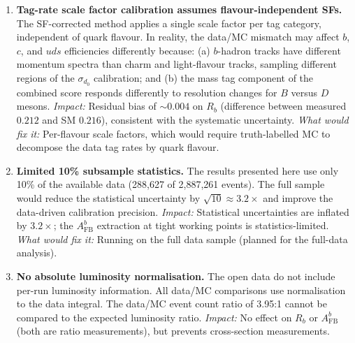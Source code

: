 \documentclass[11pt,a4paper]{article}
\begin{document}
\begin{enumerate}
\item \textbf{Tag-rate scale factor calibration assumes
  flavour-independent SFs.}
  The SF-corrected method applies a single scale factor per
  tag category, independent of quark flavour.
  In reality, the data/MC mismatch may affect $b$, $c$, and
  $uds$ efficiencies differently because:
  (a) $b$-hadron tracks have different momentum spectra than
  charm and light-flavour tracks, sampling different regions of
  the $\sigma_{d_0}$ calibration; and
  (b) the mass tag component of the combined score responds
  differently to resolution changes for $B$ versus $D$ mesons.
  \textit{Impact:} Residual bias of $\sim 0.004$ on $R_b$
  (difference between measured $0.212$ and SM $0.216$),
  consistent with the systematic uncertainty.
  \textit{What would fix it:} Per-flavour scale factors, which
  would require truth-labelled MC to decompose the data tag rates
  by quark flavour.

\item \textbf{Limited 10\% subsample statistics.}
  The results presented here use only 10\% of the available data
  (288,627 of 2,887,261 events).
  The full sample would reduce the statistical uncertainty by
  $\sqrt{10} \approx 3.2\times$ and improve the data-driven
  calibration precision.
  \textit{Impact:} Statistical uncertainties are inflated by
  $3.2\times$; the $A_\text{FB}^b$ extraction at tight working
  points is statistics-limited.
  \textit{What would fix it:} Running on the full data sample
  (planned for the full-data analysis).

\item \textbf{No absolute luminosity normalisation.}
  The open data do not include per-run luminosity information.
  All data/MC comparisons use normalisation to the data integral.
  The data/MC event count ratio of 3.95:1 cannot be compared to
  the expected luminosity ratio.
  \textit{Impact:} No effect on $R_b$ or $A_\text{FB}^b$ (both
  are ratio measurements), but prevents cross-section
  measurements.

\end{enumerate}

\clearpage


\clearpage
\appendix
\end{document}
